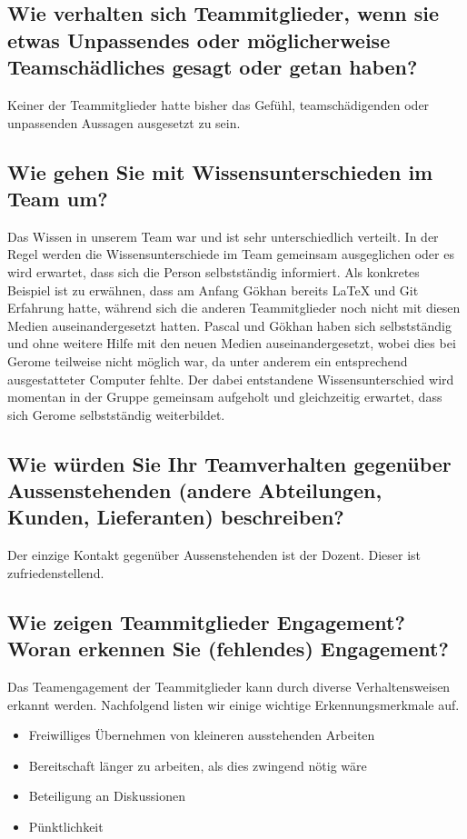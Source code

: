 \subsection*{Wie verhalten sich Teammitglieder, wenn sie etwas Unpassendes oder möglicherweise Teamschädliches gesagt oder getan haben?}

Keiner der Teammitglieder hatte bisher das Gefühl, teamschädigenden oder unpassenden Aussagen ausgesetzt zu sein.

\subsection*{Wie gehen Sie mit Wissensunterschieden im Team um?}

Das Wissen in unserem Team war und ist sehr unterschiedlich verteilt. 
In der Regel werden die Wissensunterschiede im Team gemeinsam ausgeglichen oder es wird erwartet, dass sich die Person selbstständig informiert. Als konkretes Beispiel ist zu erwähnen, dass am Anfang Gökhan bereits LaTeX und Git Erfahrung hatte, während sich die anderen Teammitglieder noch nicht mit diesen Medien auseinandergesetzt hatten. Pascal und Gökhan haben sich selbstständig und ohne weitere Hilfe mit den neuen Medien auseinandergesetzt, wobei dies bei Gerome teilweise nicht möglich war, da unter anderem ein entsprechend ausgestatteter Computer fehlte. Der dabei entstandene Wissensunterschied wird momentan in der Gruppe gemeinsam aufgeholt und gleichzeitig erwartet, dass sich Gerome selbstständig weiterbildet.  

\subsection*{Wie würden Sie Ihr Teamverhalten gegenüber Aussenstehenden (andere Abteilungen,
Kunden, Lieferanten) beschreiben?}

Der einzige Kontakt gegenüber Aussenstehenden ist der Dozent. Dieser ist zufriedenstellend. 

\subsection*{Wie zeigen Teammitglieder Engagement? Woran erkennen Sie (fehlendes)
Engagement?}

Das Teamengagement der Teammitglieder kann durch diverse Verhaltensweisen erkannt werden. Nachfolgend listen wir einige wichtige Erkennungsmerkmale auf.

\begin{itemize}

\item Freiwilliges Übernehmen von kleineren ausstehenden Arbeiten

\item Bereitschaft länger zu arbeiten, als dies zwingend nötig wäre

\item Beteiligung an Diskussionen

\item Pünktlichkeit

\end{itemize}

